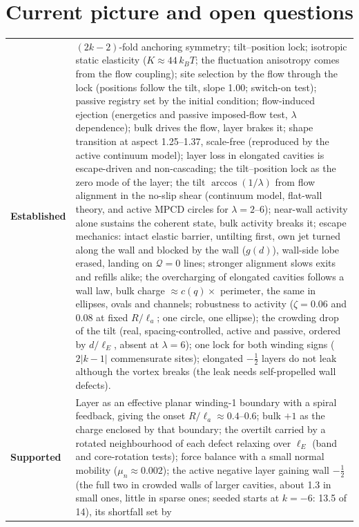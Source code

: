 \documentclass[11pt,a4paper]{article}
\newcommand{\half}{\tfrac12}
\newcommand{\la}{\ell_a}
\newcommand{\kT}{k_BT}
\begin{document}
\section{Current picture and open questions}
\begin{table}[H]\centering\small
\begin{tabularx}{\textwidth}{@{}lX@{}}
\toprule
\textbf{Established} & $(2k-2)$-fold anchoring symmetry; tilt--position lock; isotropic static elasticity ($K\approx44\,\kT$; the fluctuation anisotropy comes from the flow coupling); site selection by the flow through the lock (positions follow the tilt, slope 1.00; switch-on test); passive registry set by the initial condition;
flow-induced ejection (energetics and passive imposed-flow test, $\lambda$ dependence); bulk drives the flow, layer brakes it; shape transition at aspect 1.25--1.37, scale-free (reproduced by the active continuum model);
layer loss in elongated cavities is escape-driven and non-cascading; the tilt--position lock as the zero mode of the layer; the tilt $\arccos(1/\lambda)$ from flow
alignment in the no-slip shear (continuum model, flat-wall theory, and active MPCD circles for $\lambda=2$--6); near-wall activity alone sustains the coherent state, bulk activity breaks it;
escape mechanics: intact elastic barrier, untilting first, own jet turned along the wall and blocked by the wall ($g(d)$), wall-side lobe erased, landing on $\mathcal Q=0$ lines;
stronger alignment slows exits and refills alike; the overcharging of elongated cavities follows a wall law, bulk charge $\approx c(q)\times$ perimeter, the same in ellipses, ovals and channels;
robustness to activity ($\zeta=0.06$ and 0.08 at fixed $R/\la$; one circle, one ellipse); the crowding drop of the tilt (real, spacing-controlled, active and passive, ordered by $d/\ell_E$, absent at $\lambda=6$);
one lock for both winding signs ($2|k-1|$ commensurate sites); elongated $-\half$ layers do not leak although the vortex breaks (the leak needs self-propelled wall defects). \\
\textbf{Supported} & Layer as an effective planar winding-1 boundary with a spiral feedback, giving the onset $R/\la\approx0.4$--0.6; bulk $+1$ as the charge enclosed
by that boundary; the overtilt carried by a rotated neighbourhood of each defect relaxing over $\ell_E$ (band and core-rotation tests); force balance with a small normal mobility ($\mu_n\approx0.002$);
the active negative layer gaining wall $-\half$ (the full two in crowded walls of larger cavities, about 1.3 in small ones, little in sparse ones; seeded starts at $k=-6$: 13.5 of 14), its shortfall set by

\end{tabularx}
\end{table}
\end{document}
